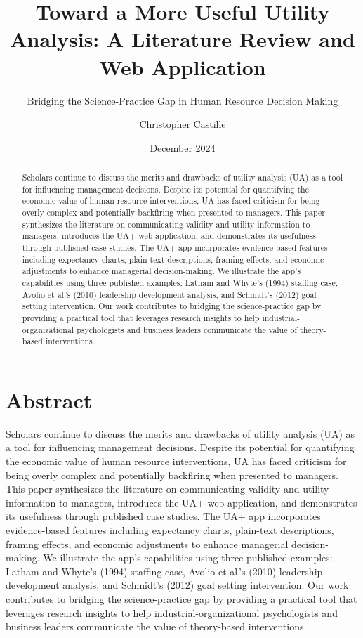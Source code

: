 \documentclass[
]{article}
\title{Toward a More Useful Utility Analysis: A Literature Review and
Web Application}
\subtitle{Bridging the Science-Practice Gap in Human Resource Decision
Making}
\author{Christopher Castille}
\date{December 2024}
\begin{document}
\maketitle
\begin{abstract}
Scholars continue to discuss the merits and drawbacks of utility
analysis (UA) as a tool for influencing management decisions. Despite
its potential for quantifying the economic value of human resource
interventions, UA has faced criticism for being overly complex and
potentially backfiring when presented to managers. This paper
synthesizes the literature on communicating validity and utility
information to managers, introduces the UA+ web application, and
demonstrates its usefulness through published case studies. The UA+ app
incorporates evidence-based features including expectancy charts,
plain-text descriptions, framing effects, and economic adjustments to
enhance managerial decision-making. We illustrate the app's capabilities
using three published examples: Latham and Whyte's (1994) staffing case,
Avolio et al.'s (2010) leadership development analysis, and Schmidt's
(2012) goal setting intervention. Our work contributes to bridging the
science-practice gap by providing a practical tool that leverages
research insights to help industrial-organizational psychologists and
business leaders communicate the value of theory-based interventions.
\end{abstract}

\section{Abstract}\label{abstract}

Scholars continue to discuss the merits and drawbacks of utility
analysis (UA) as a tool for influencing management decisions. Despite
its potential for quantifying the economic value of human resource
interventions, UA has faced criticism for being overly complex and
potentially backfiring when presented to managers. This paper
synthesizes the literature on communicating validity and utility
information to managers, introduces the UA+ web application, and
demonstrates its usefulness through published case studies. The UA+ app
incorporates evidence-based features including expectancy charts,
plain-text descriptions, framing effects, and economic adjustments to
enhance managerial decision-making. We illustrate the app's capabilities
using three published examples: Latham and Whyte's (1994) staffing case,
Avolio et al.'s (2010) leadership development analysis, and Schmidt's
(2012) goal setting intervention. Our work contributes to bridging the
science-practice gap by providing a practical tool that leverages
research insights to help industrial-organizational psychologists and
business leaders communicate the value of theory-based interventions.
\end{document}
